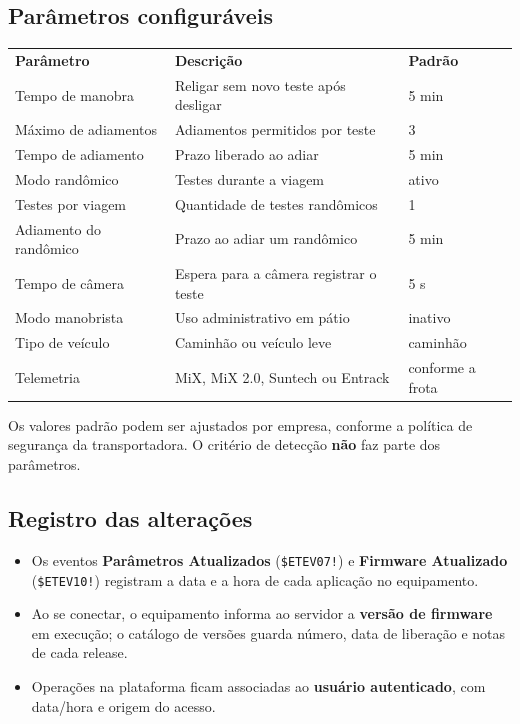\documentclass[a4paper,10pt]{article}
\newcommand{\ev}[1]{\texttt{\$ETEV#1!}}
\newcommand{\thead}[1]{\textbf{\color{white}#1}}
\newcommand{\headrow}{\rowcolor{sdark}}
\begin{document}
\begin{multicols}{2}
\subsection{Parâmetros configuráveis}
\footnotesize
\begin{tabularx}{\linewidth}{@{}B{27mm}LP{13mm}@{}}
\headrow \thead{Parâmetro} & \thead{Descrição} & \thead{Padrão}\\
Tempo de manobra & Religar sem novo teste após desligar & 5 min\\
 Máximo de adiamentos & Adiamentos permitidos por teste & 3\\
Tempo de adiamento & Prazo liberado ao adiar & 5 min\\
 Modo randômico & Testes durante a viagem & ativo\\
Testes por viagem & Quantidade de testes randômicos & 1\\
 Adiamento do randômico & Prazo ao adiar um randômico & 5 min\\
Tempo de câmera & Espera para a câmera registrar o teste & 5 s\\
 Modo manobrista & Uso administrativo em pátio & inativo\\
Tipo de veículo & Caminhão ou veículo leve & caminhão\\
 Telemetria & MiX, MiX 2.0, Suntech ou Entrack & conforme a frota\\
\end{tabularx}
\normalsize

{\small Os valores padrão podem ser ajustados por empresa, conforme a política de segurança
da transportadora. O critério de detecção \textbf{não} faz parte dos parâmetros.}

\subsection{Registro das alterações}
\begin{itemize}
  \item Os eventos \textbf{Parâmetros Atualizados} (\ev{07}) e \textbf{Firmware Atualizado} (\ev{10}) registram a data e a hora de cada aplicação no equipamento.
  \item Ao se conectar, o equipamento informa ao servidor a \textbf{versão de firmware} em execução; o catálogo de versões guarda número, data de liberação e notas de cada release.
  \item Operações na plataforma ficam associadas ao \textbf{usuário autenticado}, com data/hora e origem do acesso.
\end{itemize}


\end{multicols}
\end{document}
